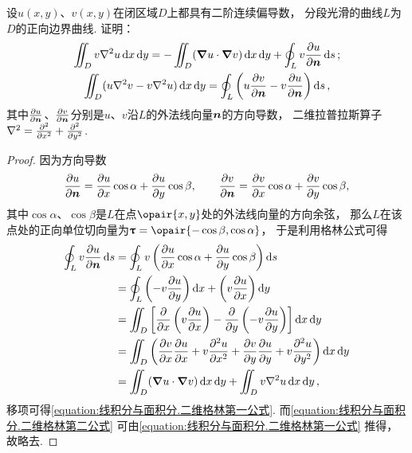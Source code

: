 \begin{example}
设\(u(x,y)\)、\(v(x,y)\)在闭区域\(D\)上都具有二阶连续偏导数，
分段光滑的曲线\(L\)为\(D\)的正向边界曲线.
证明：\begin{gather}
	\iint_D v \laplacian{u} \dd{x}\dd{y}
	= - \iint_D (\grad u \cdot \grad v) \dd{x}\dd{y} + \oint_L v \pdv{u}{\vb{n}} \dd{s};
	\label{equation:线积分与面积分.二维格林第一公式} \\
	\iint_D (u \laplacian v - v \laplacian u) \dd{x}\dd{y}
	= \oint_L \left( u \pdv{v}{\vb{n}} - v \pdv{u}{\vb{n}} \right) \dd{s},
	\label{equation:线积分与面积分.二维格林第二公式}
\end{gather}
其中\(\pdv{u}{\boldsymbol{n}}\)、\(\pdv{v}{\boldsymbol{n}}\)分别是\(u\)、\(v\)沿\(L\)的外法线向量\(\boldsymbol{n}\)的方向导数，
二维拉普拉斯算子\(\laplacian = \pdv[2]{x} + \pdv[2]{y}\).
\begin{proof}
因为方向导数\[
\pdv{u}{\boldsymbol{n}}
= \pdv{u}{x} \cos\alpha
+ \pdv{u}{y} \cos\beta,
\qquad
\pdv{v}{\boldsymbol{n}}
= \pdv{v}{x} \cos\alpha
+ \pdv{v}{y} \cos\beta,
\]其中\(\cos\alpha\)、\(\cos\beta\)是\(L\)在点\(\opair{x,y}\)处的外法线向量的方向余弦，
那么\(L\)在该点处的正向单位切向量为\(\vb{\tau} = \opair{-\cos\beta,\cos\alpha}\)，
于是利用格林公式可得\begin{align*}
\oint_L v \pdv{u}{\vb{n}} \dd{s}
&= \oint_L v \left(
\pdv{u}{x} \cos\alpha
+ \pdv{u}{y} \cos\beta
\right) \dd{s} \\
&= \oint_L \left( - v \pdv{u}{y} \right) \dd{x}
	+ \left( v \pdv{u}{x} \right) \dd{y} \\
&= \iint_D \left[
	\pdv{x} \left( v \pdv{u}{x} \right)
	- \pdv{y} \left( - v \pdv{u}{y} \right)
	\right] \dd{x}\dd{y} \\
&= \iint_D \left(
	\pdv{v}{x} \pdv{u}{x}
	+ v \pdv[2]{u}{x}
	+ \pdv{v}{y} \pdv{u}{y}
	+ v \pdv[2]{u}{y}
	\right) \dd{x}\dd{y} \\
&= \iint_D (\grad u \cdot \grad v) \dd{x}\dd{y}
	+ \iint_D v \laplacian{u} \dd{x}\dd{y},
\end{align*}
移项可得\cref{equation:线积分与面积分.二维格林第一公式}.
而\cref{equation:线积分与面积分.二维格林第二公式} 可由\cref{equation:线积分与面积分.二维格林第一公式} 推得，
故略去.
\end{proof}
\end{example}

